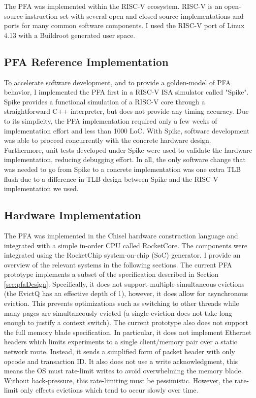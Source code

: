 The PFA was implemented within the RISC-V ecosystem. RISC-V is an open-source
instruction set with several open and closed-source implementations and ports
for many common software components\cite{riscv}. I used the RISC-V port of
Linux 4.13 with a Buildroot generated user space.

\subsection{PFA Reference Implementation}
To accelerate software development, and to provide a golden-model of
PFA behavior, I implemented the PFA first in a RISC-V ISA simulator called
"Spike"\cite{spike}. Spike provides a functional simulation of a RISC-V core
through a straightforward C++ interpreter, but does not provide any timing
accuracy. Due to its simplicity, the PFA implementation required only a few
weeks of implementation effort and less than 1000 LoC. With Spike, software
development was able to proceed concurrently with the concrete hardware design.
Furthermore, unit tests developed under Spike were used to validate the
hardware implementation, reducing debugging effort. In all, the only software
change that was needed to go from Spike to a concrete implementation was one
extra TLB flush due to a difference in TLB design between Spike and the RISC-V
implementation we used.

\subsection{Hardware Implementation}
The PFA was implemented in the Chisel hardware construction
language\cite{chisel} and integrated with a simple in-order CPU called
RocketCore\cite{rocketchip}. The components were integrated using the
RocketChip system-on-chip (SoC) generator\cite{rocketchip}. I provide an
overview of the relevant systems in the following sections. The current PFA
prototype implements a subset of the specification described in Section
\ref{sec:pfaDesign}. Specifically, it does not support multiple simultaneous
evictions (the EvictQ has an effective depth of 1), however, it does allow for
asynchronous eviction. This prevents optimizations such as switching to other
threads while many pages are simultaneously evicted (a single eviction does not
take long enough to justify a context switch). The current prototype also does
not support the full memory blade specification. In particular, it does not
implement Ethernet headers which limits experiments to a single client/memory
pair over a static network route. Instead, it sends a simplified form of packet
header with only opcode and transaction ID. It also does not use a write
acknowledgment, this means the OS must rate-limit writes to avoid overwhelming
the memory blade. Without back-pressure, this rate-limiting must be
pessimistic.  However, the rate-limit only effects evictions which tend to
occur slowly over time.
 
